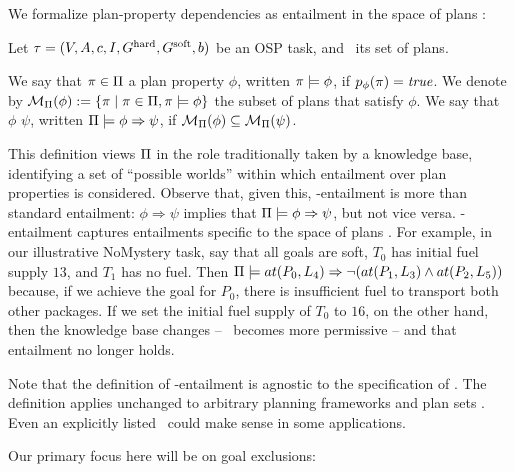 We formalize plan-property dependencies as entailment in the space of
plans \plans:

\begin{definition}
\label{def:pi-entailment}
Let $\tau =
(V,\allowbreak A,\allowbreak{\ensuremath{c}},\allowbreak I,\allowbreak G^{\text{\textup{hard}}},\allowbreak G^{\text{\textup{soft}}},\allowbreak{\ensuremath{b}})$
be an OSP task, and \plans\ its set of plans.

We say that $\pi \in \Pi$  a plan property
$\phi$, written $\pi \models \phi$, if $p_\phi(\pi) =
\mathit{true}$. We denote by ${\cal M}_{\Pi}(\phi) := \{\pi \mid \pi
\in \Pi, \pi \models \phi\}$ the subset of plans that satisfy
$\phi$.
%
%
We say that $\phi$  $\psi$, written
$\Pi \models \phi \Rightarrow \psi$, if ${\cal M}_{\Pi}(\phi) \subseteq
{\cal M}_{\Pi}(\psi)$.
%
\end{definition}

This definition views $\Pi$ in the role traditionally taken by a
knowledge base, identifying a set of ``possible worlds'' within which
entailment over plan properties is considered.
%
Observe that, given this, \plans-entailment is more than standard
entailment: $\phi \Rightarrow \psi$ implies that
$\Pi \models \phi \Rightarrow \psi$, but not vice versa. \plans-entailment
captures entailments specific to the space of plans \plans. For
example, in our illustrative NoMystery task, say that all goals are
soft, $T_0$ has initial fuel supply $13$, and $T_1$ has no fuel. Then
$\Pi \models at(P_0,L_4) \Rightarrow \neg (at(P_1,L_3) \wedge at(P_2,L_5))$
because, if we achieve the goal for $P_0$, there is insufficient fuel
to transport both other packages. If we set the initial fuel supply of
$T_0$ to $16$, on the other hand, then the knowledge base changes --
\plans\ becomes more permissive -- and that entailment no longer
holds.
%

Note that the definition of \plans-entailment is agnostic to the
specification of \plans. The definition applies unchanged to arbitrary
planning frameworks and plan sets \plans. Even an explicitly listed
\plans\ could make sense in some applications.

Our primary focus here will be on goal exclusions:

